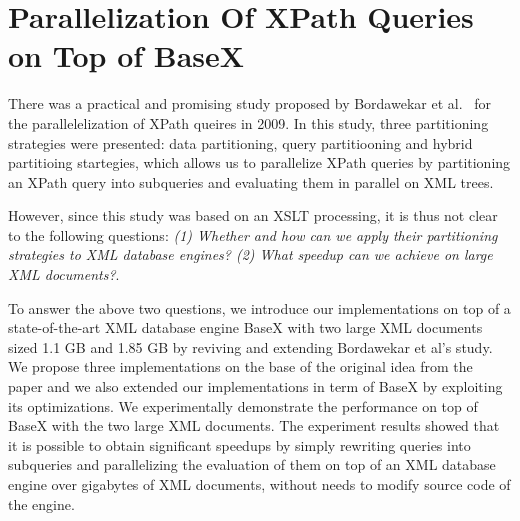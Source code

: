 \newcommand{\Placeholder}[1]{$\langle\!\langle\mbox{\textrm{#1}}\rangle\!\rangle$}
\newcommand{\bfn}[1]{\textup{#1}}
\newcommand{\Src}[1]{\texttt{#1}}
\newcommand{\fn}[1]{\mathit{#1}}
\newcommand{\modify}[3]{{\underline{\sf{#1}}:} {\color{blue}{#2}} {\color{green}{\mbox{$\Rightarrow$}}} {\color{red}{#3}}}
\newcommand{\todo}[2]{{\underline{\textsf{#1}}:} {\color{red}{$\spadesuit$#2$\spadesuit$}}}
\newcommand{\hack}{{\color{red}{$\blacklozenge$}}}


\chapter{Parallelization Of XPath Queries on Top of BaseX}

There was a practical and promising study proposed by Bordawekar et
al.~\cite{Bord10} for the parallelelization of XPath queires in 2009. In this
study, three partitioning strategies were presented: data partitioning, query
partitiooning and hybrid partitioing startegies, which allows us to parallelize
XPath queries by partitioning an XPath query into subqueries and evaluating them
in parallel on XML trees.

However, since this study was based on an XSLT processing, it is thus not clear
to the following questions: \textit{(1) Whether and how can we apply their
partitioning strategies to XML database engines? (2) What speedup can we achieve
on large XML documents?}.

To answer the above two questions, we introduce our implementations on top of a
state-of-the-art XML database engine BaseX with two large XML documents sized
1.1 GB and 1.85 GB by reviving and extending Bordawekar et al's study. We
propose three implementations on the base of the original idea from the paper
and we also extended our implementations in term of BaseX by exploiting its
optimizations. We experimentally demonstrate the performance on top of BaseX
with the two large  XML documents. The experiment results showed that it is
possible to obtain significant speedups by simply rewriting queries into
subqueries and parallelizing the evaluation of them on top of an XML database
engine over gigabytes of XML documents, without needs to modify source code of
the engine.















